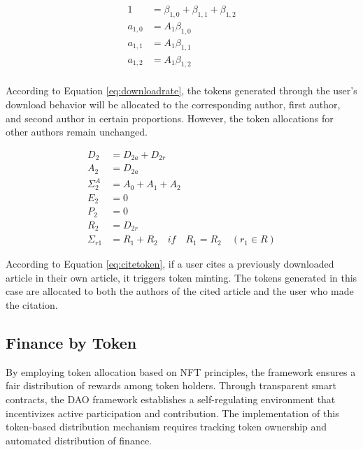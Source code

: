 \documentclass[lettersize,journal]{IEEEtran}
\begin{document}
\begin{equation}
  \begin{aligned}
    1 &= \beta_{1, 0} + \beta_{1, 1} + \beta_{1, 2} \\
    a_{1,0} &= A_1 \beta_{1, 0}  \\
    a_{1,1} &= A_1 \beta_{1, 1}  \\
    a_{1,2} &= A_1 \beta_{1, 2}  \\
  \end{aligned}
  \label{eq:downloadrate}
\end{equation}

According to Equation \ref{eq:downloadrate}, the tokens generated through the user's download behavior will be allocated to the corresponding author, first author, and second author in certain proportions. However, the token allocations for other authors remain unchanged.


\begin{equation}
  \begin{aligned}
    D_2 &= D_{2a} + D_{2r} \\
    A_2 &= D_{2a} \\
    \Sigma^A_2 &= A_0 + A_1 + A_2 \\
    E_2 &= 0 \\
    P_2 &= 0 \\
    R_2 &= D_{2r} \\
    \Sigma_{r1} & = R_1 + R_2 \quad if \quad R_1 = R_2 \quad (r_1 \in R ) 
  \end{aligned}
  \label{eq:citetoken}
\end{equation}

According to Equation \ref{eq:citetoken}, if a user cites a previously downloaded article in their own article, it triggers token minting. The tokens generated in this case are allocated to both the authors of the cited article and the user who made the citation.



\subsection{Finance by Token}

By employing token allocation based on NFT principles, the framework ensures a fair distribution of rewards among token holders. Through transparent smart contracts, the DAO framework establishes a self-regulating environment that incentivizes active participation and contribution. The implementation of this token-based distribution mechanism requires tracking token ownership and automated distribution of finance.
\end{document}
